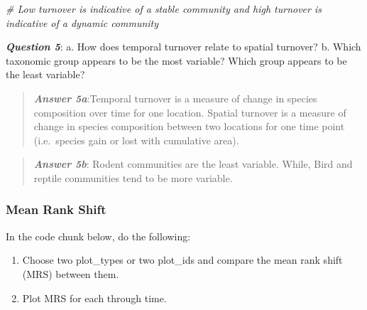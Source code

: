 \documentclass[]{article}
\newenvironment{Shaded}{\begin{snugshade}}{\end{snugshade}}
\newcommand{\CommentTok}[1]{\textcolor[rgb]{0.56,0.35,0.01}{\textit{{#1}}}}
\providecommand{\tightlist}{%
  \setlength{\itemsep}{0pt}\setlength{\parskip}{0pt}}
\begin{document}
\begin{Shaded}
\begin{Highlighting}[]
\CommentTok{# Low turnover is indicative of a stable community and high turnover is indicative of a dynamic community}
\end{Highlighting}
\end{Shaded}

\textbf{\emph{Question 5}}: a. How does temporal turnover relate to
spatial turnover? b. Which taxonomic group appears to be the most
variable? Which group appears to be the least variable?

\begin{quote}
\textbf{\emph{Answer 5a}}:Temporal turnover is a measure of change in
species composition over time for one location. Spatial turnover is a
measure of change in species composition between two locations for one
time point (i.e.~species gain or lost with cumulative area).
\end{quote}

\begin{quote}
\textbf{\emph{Answer 5b}}: Rodent communities are the least variable.
While, Bird and reptile communities tend to be more variable.
\end{quote}

\subsubsection{Mean Rank Shift}\label{mean-rank-shift}

In the code chunk below, do the following:

\begin{enumerate}
\def\labelenumi{\arabic{enumi}.}
\tightlist
\item
  Choose two plot\_types or two plot\_ids and compare the mean rank
  shift (MRS) between them.
\item
  Plot MRS for each through time.
\end{enumerate}
\end{document}
